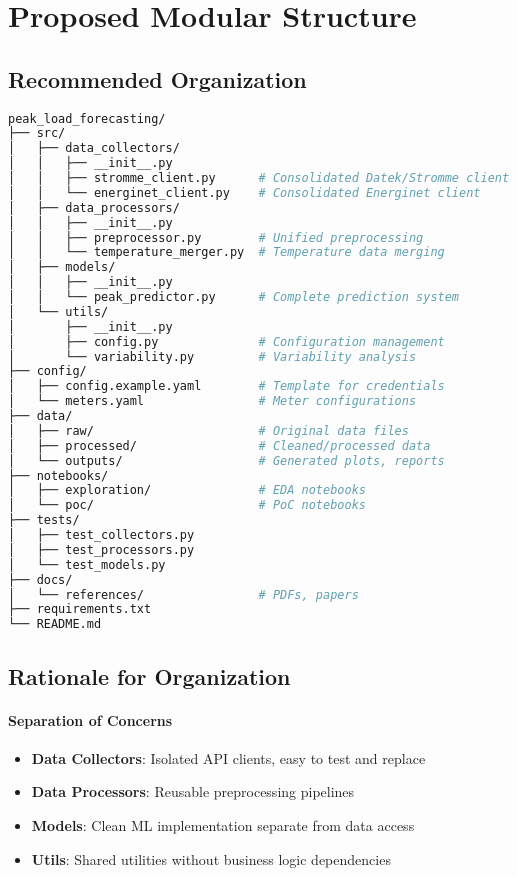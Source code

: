 \documentclass[11pt,a4paper]{article}
\begin{document}
\section{Proposed Modular Structure}

\subsection{Recommended Organization}

\begin{lstlisting}[language=bash, caption={Proposed modular structure}]
peak_load_forecasting/
├── src/
│   ├── data_collectors/
│   │   ├── __init__.py
│   │   ├── stromme_client.py      # Consolidated Datek/Stromme client
│   │   └── energinet_client.py    # Consolidated Energinet client
│   ├── data_processors/
│   │   ├── __init__.py
│   │   ├── preprocessor.py        # Unified preprocessing
│   │   └── temperature_merger.py  # Temperature data merging
│   ├── models/
│   │   ├── __init__.py
│   │   └── peak_predictor.py      # Complete prediction system
│   └── utils/
│       ├── __init__.py
│       ├── config.py              # Configuration management
│       └── variability.py         # Variability analysis
├── config/
│   ├── config.example.yaml        # Template for credentials
│   └── meters.yaml                # Meter configurations
├── data/
│   ├── raw/                       # Original data files
│   ├── processed/                 # Cleaned/processed data
│   └── outputs/                   # Generated plots, reports
├── notebooks/
│   ├── exploration/               # EDA notebooks
│   └── poc/                       # PoC notebooks
├── tests/
│   ├── test_collectors.py
│   ├── test_processors.py
│   └── test_models.py
├── docs/
│   └── references/                # PDFs, papers
├── requirements.txt
└── README.md
\end{lstlisting}

\subsection{Rationale for Organization}

\paragraph{Separation of Concerns}
\begin{itemize}
    \item \textbf{Data Collectors}: Isolated API clients, easy to test and replace
    \item \textbf{Data Processors}: Reusable preprocessing pipelines
    \item \textbf{Models}: Clean ML implementation separate from data access
    \item \textbf{Utils}: Shared utilities without business logic dependencies
\end{itemize}
\end{document}
